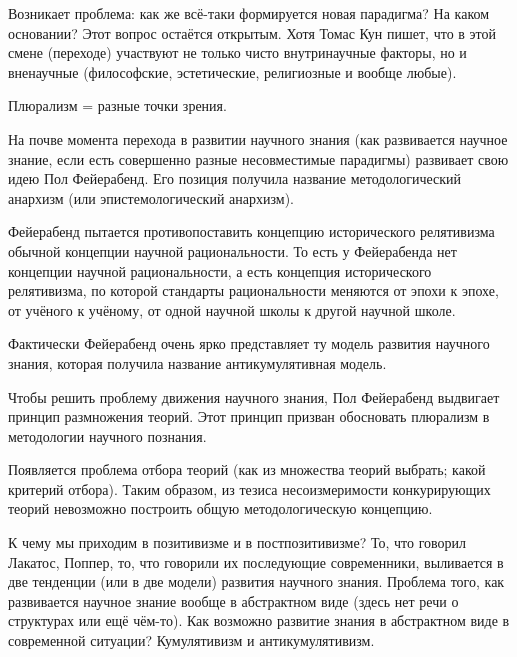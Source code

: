 \documentclass[main.tex]{subfiles}
\begin{document}

Возникает проблема: как же всё-таки формируется новая парадигма? На каком основании?
Этот вопрос остаётся открытым.
Хотя Томас Кун пишет, что в этой смене (переходе) участвуют не только чисто внутринаучные факторы, но и вненаучные (философские, эстетические, религиозные и вообще любые).

Плюрализм = разные точки зрения.



На почве момента перехода в развитии научного знания (как развивается научное знание, если есть совершенно разные несовместимые парадигмы) развивает свою идею Пол Фейерабенд.
Его позиция получила название методологический анархизм (или эпистемологический анархизм).

Фейерабенд пытается противопоставить концепцию исторического релятивизма обычной концепции научной рациональности.
То есть у Фейерабенда нет концепции научной рациональности, а есть концепция исторического релятивизма, по которой стандарты рациональности меняются от эпохи к эпохе, от учёного к учёному, от одной научной школы к другой научной школе.

Фактически Фейерабенд очень ярко представляет ту модель развития научного знания, которая получила название антикумулятивная модель.


Чтобы решить проблему движения научного знания, Пол Фейерабенд выдвигает принцип размножения теорий.
Этот принцип призван обосновать плюрализм в методологии научного познания.

Появляется проблема отбора теорий (как из множества теорий выбрать; какой критерий отбора).
Таким образом, из тезиса несоизмеримости конкурирующих теорий невозможно построить общую методологическую концепцию.



К чему мы приходим в позитивизме и в постпозитивизме?
То, что говорил Лакатос, Поппер, то, что говорили их последующие современники, выливается в две тенденции (или в две модели) развития научного знания.
Проблема того, как развивается научное знание вообще в абстрактном виде (здесь нет речи о структурах или ещё чём-то).
Как возможно развитие знания в абстрактном виде в современной ситуации?
Кумулятивизм и антикумулятивизм.
\end{document}
